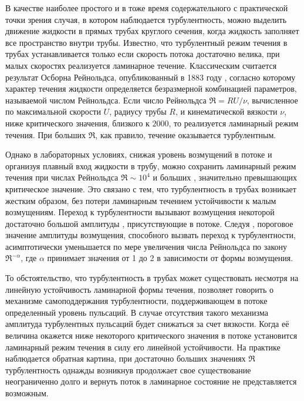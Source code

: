 В качестве наиболее простого и в тоже время содержательного с практической точки зрения случая, в котором наблюдается турбулентность, можно выделить движение жидкости в прямых трубах круглого сечения, когда жидкость заполняет все пространство внутри трубы. Известно, что турбулентный режим течения в трубах устанавливается только если скорость потока достаточно велика, при малых скоростях реализуется ламинарное течение. Классическим считается результат Осборна Рейнольдса, опубликованный в 1883 году \cite{Reynolds1883}, согласно которому характер течения жидкости определяется безразмерной комбинацией параметров, называемой числом Рейнольдса. Если число Рейнольдса $\Re = RU/\nu$, вычисленное по максимальной скорости $U$, радиусу трубы $R$, и кинематической вязкости $\nu$, ниже критического значения, близкого к $2000$, то реализуется ламинарный режим течения. При больших $\Re$, как правило, течение оказывается турбулентным. 

Однако в лабораторных условиях, снижая уровень возмущений в потоке и организуя плавный вход жидкости в трубу, можно сохранить ламинарный режим течения при числах Рейнольдса $\Re \sim 10^4$ и больших \cite{Wygnanski1973, Darbyshire1995, vanDoorne2009}, значительно превышающих критическое значение. Это связано с тем, что турбулентность в трубах возникает жестким образом, без потери ламинарным течением устойчивости к малым возмущениям. Переход к турбулентности вызывают возмущения некоторой достаточно большой амплитуды \cite{Grossmann2000}, присутствующие в потоке. Следуя \cite{Darbyshire1995, Hof2003, Peixinho2007, Mellibovsky2009critical}, пороговое значение амплитуды возмущения, способного вызвать переход к турбулентности, асимптотически уменьшается по мере увеличения числа Рейнольдса по закону $\Re^{-\alpha}$, где $\alpha$ принимает значения от 1 до 2 в зависимости от формы возмущения. 

То обстоятельство, что турбулентность в трубах может существовать несмотря на линейную устойчивость ламинарной формы течения, позволяет говорить о механизме самоподдержания турбулентности, поддерживающем в потоке определенный уровень пульсаций. В случае отсутствия такого механизма амплитуда турбулентных пульсаций будет снижаться за счет вязкости. Когда её величина окажется ниже некоторого критического значения в потоке установится ламинарный режим течения в силу его линейной устойчивости. На практике наблюдается обратная картина, при достаточно больших значениях $\Re$ турбулентность однажды возникнув продолжает свое существование неограниченно долго и вернуть поток в ламинарное состояние не представляется возможным. 

